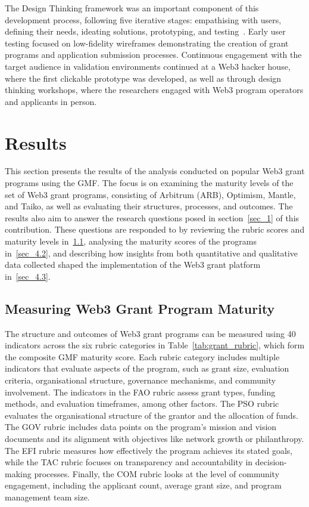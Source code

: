 \documentclass[conference]{IEEEtran}
\begin{document}
The Design Thinking framework was an important component of this development process, following five iterative stages: empathising with users, defining their needs, ideating solutions, prototyping, and testing~\cite{ambrose_basics_2010,wolniak_design_2017}. Early user testing focused on low-fidelity wireframes demonstrating the creation of grant programs and application submission processes. Continuous engagement with the target audience in validation environments continued at a Web3 hacker house, where the first clickable prototype was developed, as well as through design thinking workshops, where the researchers engaged with Web3 program operators and applicants in person.

\section{Results}\label{sec_4}

This section presents the results of the analysis conducted on popular Web3 grant programs using the GMF. The focus is on examining the maturity levels of the set of Web3 grant programs, consisting of Arbitrum (ARB), Optimism, Mantle, and Taiko, as well as evaluating their structures, processes, and outcomes. The results also aim to answer the research questions posed in section~\ref{sec_1} of this contribution. These questions are responded to by reviewing the rubric scores and maturity levels in~\ref{sec_4.1}, analysing the maturity scores of the programs in~\ref{sec_4.2}, and describing how insights from both quantitative and qualitative data collected shaped the implementation of the Web3 grant platform in~\ref{sec_4.3}.

\subsection{Measuring Web3 Grant Program Maturity}\label{sec_4.1}

The structure and outcomes of Web3 grant programs can be measured using 40 indicators across the six rubric categories in Table~\ref{tab:grant_rubric}, which form the composite GMF maturity score. Each rubric category includes multiple indicators that evaluate aspects of the program, such as grant size, evaluation criteria, organisational structure, governance mechanisms, and community involvement. The indicators in the FAO rubric assess grant types, funding methods, and evaluation timeframes, among other factors. The PSO rubric evaluates the organisational structure of the grantor and the allocation of funds. The GOV rubric includes data points on the program's mission and vision documents and its alignment with objectives like network growth or philanthropy. The EFI rubric measures how effectively the program achieves its stated goals, while the TAC rubric focuses on transparency and accountability in decision-making processes. Finally, the COM rubric looks at the level of community engagement, including the applicant count, average grant size, and program management team size.
\end{document}
